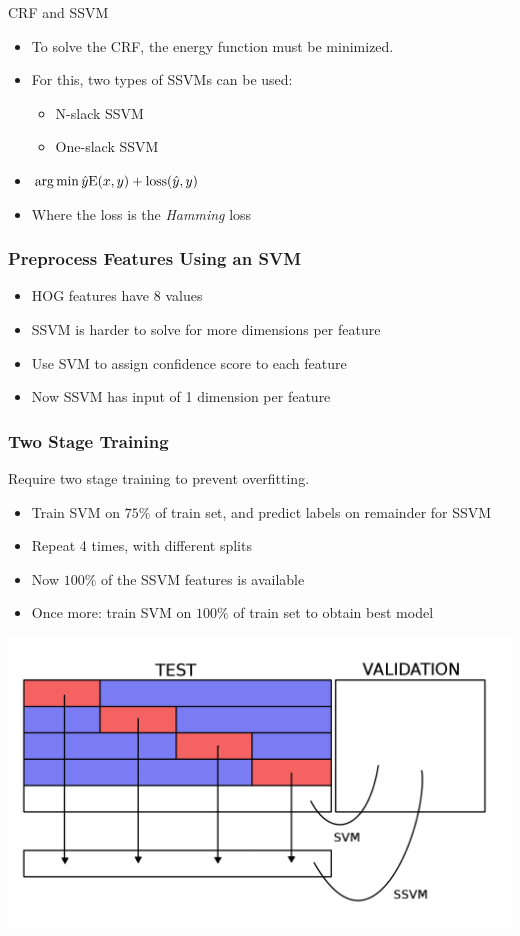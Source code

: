 \begin{frame}{CRF and SSVM}

\begin{itemize}
\item To solve the CRF, the energy function must be minimized.
\item For this, two types of SSVMs can be used:
\begin{itemize}
	\item N-slack SSVM
	\item One-slack SSVM
\end{itemize}
\item $\operatorname*{arg\,min} \hat{y} \text{E}(x, y) + \text{loss}(\hat{y}, y) $
\item Where the loss is the \emph{Hamming} loss
\end{itemize}
\end{frame}

\begin{frame}
\frametitle{Preprocess Features Using an SVM}
\begin{itemize}
\item HOG features have 8 values
\item SSVM is harder to solve for more dimensions per feature
\item Use SVM to assign confidence score to each feature
\item Now SSVM has input of 1 dimension per feature
\end{itemize}
\end{frame}

\begin{frame}
\frametitle{Two Stage Training}
Require two stage training to prevent overfitting.
\begin{itemize}
\item Train SVM on $75\%$ of train set, and predict labels on remainder for SSVM
\item Repeat 4 times, with different splits
\item Now $100\%$ of the SSVM features is available
\item Once more: train SVM on $100\%$ of train set to obtain best model
\end{itemize}
\begin{center}
\includegraphics[width=.5\paperwidth]{resources/twostage}
\end{center}
\end{frame}

